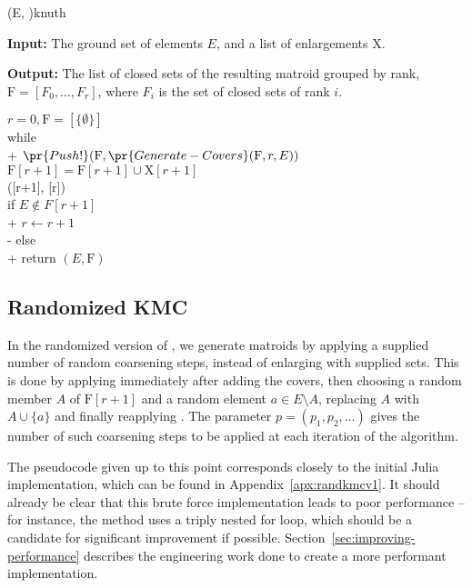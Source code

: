 \begin{algorithm}[float*=ht!]{(E, )}{knuth}

  \textbf{Input:}     \tab The ground set of elements $E$, and a list of enlargements $\mathrm{X}$.

  \textbf{Output:}    \tab The list of closed sets of the resulting matroid grouped by rank, \\
  \mbox{}\tab $\mathrm{F} = [F_0, \ldots, F_r]$, where $F_i$ is the set of closed sets of rank $i$.

  \begin{pseudo}[kw, label=\small\arabic*, indent-mark, line-height=1.2]
    $r = 0, \mathrm{F} = [\{ \emptyset \}]$ \\
    while   \\+
    $\pr{Push!}(\mathrm{F}, \pr{Generate-Covers}(\mathrm{F}, r, E))$ \\
    $\mathrm{F}[r+1] = \mathrm{F}[r+1] \cup \mathrm{X}[r+1]$ \\
    ([r+1], [r]) \\

    if $E \not \in F[r+1]$ \\+
    $r \leftarrow r+1$ \\-
    else \\+
    return $(E, \mathrm{F})$

  \end{pseudo}

\end{algorithm}


\subsection{Randomized KMC}
In the randomized version of , we generate matroids by applying a supplied number of random coarsening steps, instead of enlarging with supplied sets. This is done by applying  immediately after adding the covers, then choosing a random member $A$ of $\mathrm{F}[r+1]$ and a random element $a \in E \setminus A$, replacing $A$ with $A \cup \{a\}$ and finally reapplying . The parameter $p = (p_1, p_2, \ldots)$ gives the number of such coarsening steps to be applied at each iteration of the algorithm.

The pseudocode given up to this point corresponds closely to the initial Julia implementation, which can be found in Appendix~\ref{apx:randkmcv1}. It should already be clear that this brute force implementation leads to poor performance -- for instance, the  method uses a triply nested for loop, which should be a candidate for significant improvement if possible. Section~\ref{sec:improving-performance} describes the engineering work done to create a more performant implementation.

